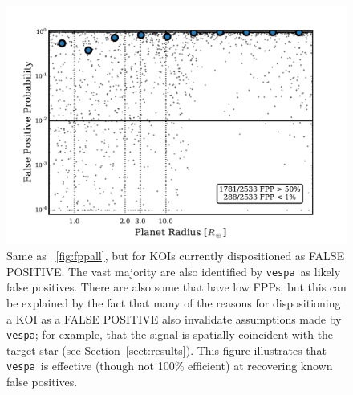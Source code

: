 \documentclass{emulateapj}
\newcommand{\figref}[1]{\ref{fig:#1}}
\newcommand{\Fig}[1]{\figurename~\figref{#1}}
\newcommand{\figlabel}[1]{\label{fig:#1}}
\newcommand{\sectionname}{Section}
\newcommand{\Sect}[1]{\sectionname~\ref{sect:#1}}
\newcommand{\vespa}{\texttt{vespa}}
\begin{document}
\begin{figure}[p]
\begin{center}
\includegraphics[width=7in]{figures/fpp_summary_fp.pdf}
\end{center}
\caption{Same as \Fig{fppall}, but for KOIs currently dispositioned
  as FALSE POSITIVE. The vast majority are also identified by \vespa\ as likely
  false positives.  There are also some that have low FPPs, but this can be
  explained by the fact that many of the reasons for dispositioning a 
  KOI as a FALSE POSITIVE also invalidate assumptions made by \vespa; 
  for example, that the signal is spatially coincident with the target 
  star (see \Sect{results}). This figure illustrates that \vespa\ is
  effective (though not 100\% efficient) at recovering known false positives.  
  \figlabel{fppfps}}
\end{figure}
 
\end{document}
